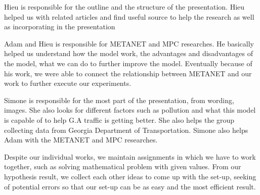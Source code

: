 \documentclass{article}
\begin{document}
Hieu is responsible for the outline and the structure of the presentation. Hieu helped us with related articles and find useful source to help the research as well as incorporating in the presentation

Adam and Hieu is responsible for METANET and MPC researches. He basically helped us understand how the model work, the advantages and disadvantages of the model, what we can do to further improve the model. Eventually because of his work, we were able to connect the relationship between METANET and our work to further execute our experiments.

Simone is responsible for the most part of the presentation, from wording, images. She also looks for different factors such as pollution and what this model is capable of to help G.A traffic is getting better. She also helps the group collecting data from Georgia Department of Transportation. Simone also helps Adam with the METANET and MPC researches.


Despite our individual works, we maintain assignments in which we have to work together, such as solving mathematical problem with given values. From our hypothesis result, we collect each other ideas to come up with the set-up, seeking of potential errors so that our set-up can be as easy and the most efficient result.
\end{document}
